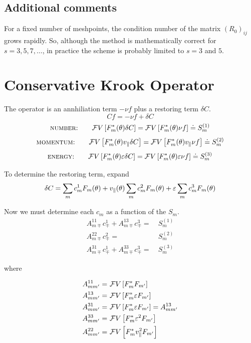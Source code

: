 \subsection{Additional comments}

For a fixed number of meshpoints, the condition number of the 
matrix $(R_0)_{ij}$ grows rapidly.  So, although the method is 
mathematically correct for $s=3,5,7,\ldots$, in practice the 
scheme is probably limited to $s=3$ and $5$.

\section{Conservative Krook Operator}

The operator is an annhiliation term $-\nu f$ plus a 
restoring term $\delta C$.
%
\begin{equation}
C f = -\nu f + \delta C 
\end{equation}
%
\begin{equation}
\mbox{{\sc number}:} \qquad {\cal F}V \left[ F_m^*(\theta) \delta C \right] 
= {\cal F}V \left[ F_m^*(\theta) \nu f \right] \doteq S_m^{(1)}
\end{equation}
\begin{equation}
\mbox{{\sc momentum}:} \qquad {\cal F}V 
 \left[ F_m^*(\theta) v_\parallel \delta C \right] 
= {\cal F}V \left[ F_m^*(\theta) v_\parallel \nu f \right] \doteq S_m^{(2)}
\end{equation}
\begin{equation}
\mbox{{\sc energy}:} \qquad {\cal F}V \left[ F_m^*(\theta) 
 {\varepsilon} \delta C \right] 
= {\cal F}V \left[ F_m^*(\theta) {\varepsilon} \nu f \right] \doteq S_m^{(3)}
\end{equation}

\noindent
To determine the restoring term, expand
%
\begin{equation}
\delta C = \sum_m c_m^1 F_m(\theta)
+ v_\parallel(\theta)\sum_m c_m^2 F_m(\theta) 
+ {\varepsilon} \sum_m c_m^3 F_m(\theta) 
\end{equation}

\noindent
Now we must determine each $c_m$ as a function of the $S_m$.
%
\begin{align}
A^{11}_{m\mp} c^1_{\mp} + A^{13}_{m\mp} c^3_{\mp} = &~S_m^{(1)} \\
                          A^{22}_{m\mp} c^2_{\mp} = &~S_m^{(2)} \\
A^{31}_{m\mp} c^1_{\mp} + A^{33}_{m\mp} c^3_{\mp} = &~S_m^{(3)}
\end{align}

where

\begin{align}
A^{11}_{m{m^\prime}} = &~{\cal F}V\left[ F_m^* F_{m^\prime} \right] \\
A^{13}_{m{m^\prime}} = &~{\cal F}V\left[ F_m^* {\varepsilon} F_{m^\prime} \right] \\
A^{31}_{m{m^\prime}} = &~{\cal F}V\left[ F_m^* {\varepsilon} F_{m^\prime} \right] = A^{13}_{m{m^\prime}} \\
A^{33}_{m{m^\prime}} = &~{\cal F}V\left[ F_m^* {\varepsilon}^2 F_{m^\prime} \right] \\
A^{22}_{m{m^\prime}} = &~{\cal F}V\left[ F_m^* v_\parallel^2 F_{m^\prime} \right]
\end{align}
